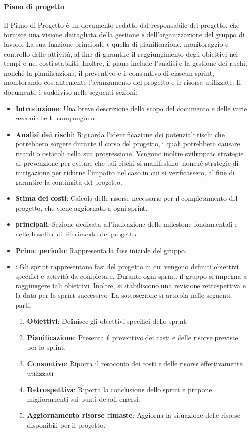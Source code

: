 \paragraph{Piano di progetto}
Il Piano di Progetto è un documento redatto dal responsabile del progetto, che fornisce una visione dettagliata della gestione e dell’organizzazione del gruppo di lavoro. La sua funzione principale è quella di pianificazione, monitoraggio e controllo delle attività, al fine di garantire il raggiungimento degli obiettivi nei tempi e nei costi stabiliti. Inoltre, il piano include l'analisi e la gestione dei rischi, nonché la pianificazione, il preventivo e il consuntivo di ciascun sprint, monitorando costantemente l'avanzamento del progetto e le risorse utilizzate.
Il documento è suddiviso nelle seguenti sezioni:
\begin{itemize}
    \item \textbf{Introduzione}: Una breve descrizione dello scopo del documento e delle varie sezioni che lo compongono.
    \item \textbf{Analisi dei rischi}: Riguarda l'identificazione dei potenziali rischi che potrebbero sorgere durante il corso del progetto, i quali potrebbero causare ritardi o ostacoli nella sua progressione. Vengono inoltre sviluppate strategie di prevenzione per evitare che tali rischi si manifestino, nonché strategie di mitigazione per ridurne l'impatto nel caso in cui si verificassero, al fine di garantire la continuità del progetto.
    \item \textbf{Stima dei costi}: Calcolo delle risorse necessarie per il completamento del progetto, che viene aggiornato a ogni sprint.
    \item \textbf{ principali}: Sezione dedicata all'indicazione delle milestone fondamentali e delle baseline di riferimento del progetto.
    \item \textbf{Primo periodo}: Rappresenta la fase iniziale del gruppo.
    \item \textbf{}: Gli sprint rappresentano fasi del progetto in cui vengono definiti obiettivi specifici e attività da completare. Durante ogni sprint, il gruppo si impegna a raggiungere tali obiettivi. Inoltre, si stabiliscono una revisione retrospettiva e la data per lo sprint successivo.
    La sottosezione si articola nelle seguenti parti:
    \begin{enumerate}
        \item \textbf{Obiettivi}: Definisce gli obiettivi specifici dello sprint.
        \item \textbf{Pianificazione}: Presenta il preventivo dei costi e delle risorse previste per lo sprint.
        \item \textbf{Consuntivo}: Riporta il resoconto dei costi e delle risorse effettivamente utilizzati.
        \item \textbf{Retrospettiva}: Riporta la conclusione dello sprint e propone miglioramenti sui punti deboli emersi.
        \item \textbf{Aggiornamento risorse rimaste}: Aggiorna la situazione delle risorse disponibili per il progetto.
    \end{enumerate}
\end{itemize}

